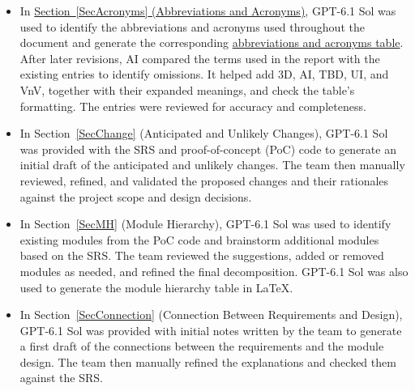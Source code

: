 \documentclass[10pt, titlepage]{article}
\begin{document}
\begin{itemize}
    \item In \hyperref[SecAcronyms]{Section~\ref*{SecAcronyms}
    (Abbreviations and Acronyms)}, GPT-6.1 Sol
    was used to identify the abbreviations and acronyms used throughout the
    document and generate the corresponding
    \hyperref[tab:VnVAcronyms]{abbreviations and acronyms table}. After later
    revisions, AI compared the terms used in the report with the existing
    entries to identify omissions. It helped add 3D, AI, TBD, UI, and VnV,
    together with their expanded meanings, and check the table's formatting.
    The entries were reviewed for accuracy and completeness.

    \item In Section~\ref{SecChange} (Anticipated and Unlikely Changes), GPT-6.1 Sol
    was provided with the SRS and proof-of-concept (PoC) code to generate an
    initial draft of the anticipated and unlikely changes. The team then
    manually reviewed, refined, and validated the proposed changes and their
    rationales against the project scope and design decisions.

    \item In Section~\ref{SecMH} (Module Hierarchy), GPT-6.1 Sol was used to
    identify existing modules from the PoC code and brainstorm additional
    modules based on the SRS. The team reviewed the suggestions, added or
    removed modules as needed, and refined the final decomposition. GPT-6.1 Sol
    was also used to generate the module hierarchy table in \LaTeX{}.

    \item In Section~\ref{SecConnection} (Connection Between Requirements and
    Design), GPT-6.1 Sol was provided with initial notes written by the team
    to generate a first draft of the connections between the requirements and
    the module design. The team then manually refined the explanations and
    checked them against the SRS.


\end{itemize}
\end{document}
